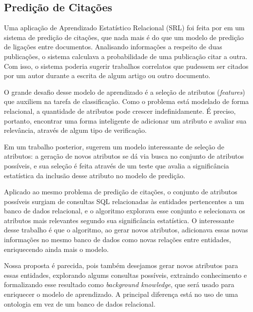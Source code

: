 \subsection{Predição de Citações}
\label{ssec:srl}

Uma aplicação de Aprendizado Estatístico Relacional (SRL) foi feita por \citet{Popescul2003} em um sistema de predição de citações, que nada mais é do que um modelo de predição de ligações entre documentos. Analisando informações a respeito de duas publicações, o sistema calculava a probabilidade de uma publicação citar a outra. Com isso, o sistema poderia sugerir trabalhos correlatos que pudessem ser citados por um autor durante a escrita de algum artigo ou outro documento.

O grande desafio desse modelo de aprendizado é a seleção de atributos (\textit{features}) que auxiliem na tarefa de classificação. Como o problema está modelado de forma relacional, a quantidade de atributos pode crescer indefinidamente. É preciso, portanto, encontrar uma forma inteligente de adicionar um atributo e avaliar sua relevância, através de algum tipo de verificação.

Em um trabalho posterior, \citet{Popescul2007} sugerem um modelo interessante de seleção de atributos: a geração de novos atributos se dá via busca no conjunto de atributos possíveis, e sua seleção é feita através de um teste que avalia a significância estatística da inclusão desse atributo no modelo de predição.

Aplicado ao mesmo problema de predição de citações, o conjunto de atributos possíveis surgiam de consultas SQL relacionadas às entidades pertencentes a um banco de dados relacional, e o algoritmo explorava esse conjunto e selecionava os atributos mais relevantes segundo sua significância estatística. O interessante desse trabalho é que o algoritmo, ao gerar novos atributos, adicionava essas novas informações no mesmo banco de dados como novas relações entre entidades, enriquecendo ainda mais o modelo.

Nossa proposta é parecida, pois também desejamos gerar novos atributos para essas entidades, explorando algums consultas possíveis, extraindo conhecimento e formalizando esse resultado como \textit{background knowledge}, que será usado para enriquecer o modelo de aprendizado.  A principal diferença está no uso de uma ontologia em vez de um banco de dados relacional.


